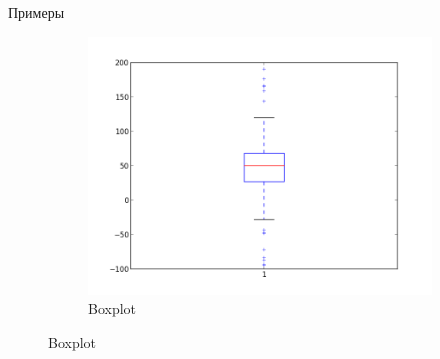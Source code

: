 \documentclass[10pt]{beamer}
\begin{document}
\begin{frame}{Примеры}
\begin{figure}
\begin{subfigure}[b]{0.3\textwidth}
                \includegraphics[width=\textwidth]{images/box.png}
                \caption{Boxplot}     
        \end{subfigure}
\end{figure}

\end{frame}
\end{document}
